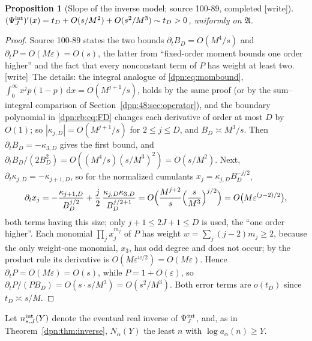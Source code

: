 \documentclass[11pt]{article}
\numberwithin{equation}{section}
\newtheorem{proposition}[theorem]{Proposition}
\theoremstyle{definition}\newtheorem{definition}[theorem]{Definition}
\theoremstyle{remark}\newtheorem{remark}[theorem]{Remark}
\newcommand{\dd}{\,\mathrm d}\newcommand{\ii}{\mathrm i}
\newcommand{\eps}{\varepsilon}
\newcommand{\wrt}{\textup{[write]}}
\begin{document}
\begin{proposition}[Slope of the inverse model; source 100-89, completed \wrt]\label{dpn:rb:prop:slope}
$(\Psi^{\rm int}_J)'(x)=t_D+O(s/M^2)+O(s^2/M^3)\sim t_D>0$, uniformly on
$\mathfrak A$.
\end{proposition}
\begin{proof}
Source 100-89 states the two bounds $\partial_tB_D=O(M^4/s)$ and
$\partial_tP=O(M\eps)=O(s)$, the latter from ``fixed-order moment bounds one
order higher'' and the fact that every nonconstant term of $P$ has weight at
least two.  \wrt\ The details: the integral analogue of
\eqref{dpn:eq:mombound}, $\int_0^\infty x^jp(1-p)\dd x=O(M^{j+1}/s)$, holds by
the same proof (or by the sum--integral comparison of
Section~\ref{dpn:48:sec:operator}), and the boundary polynomial in
\eqref{dpn:rb:eq:FD} changes each derivative of order at most $D$ by $O(1)$; so
$|\kappa_{j,D}|=O(M^{j+1}/s)$ for $2\le j\le D$, and $B_D\asymp M^3/s$.  Then
$\partial_tB_D=-\kappa_{3,D}$ gives the first bound, and
$\partial_tB_D/(2B_D^2)=O((M^4/s)(s/M^3)^2)=O(s/M^2)$.  Next,
$\partial_t\kappa_{j,D}=-\kappa_{j+1,D}$, so for the normalized cumulants
$x_j=\kappa_{j,D}B_D^{-j/2}$,
\[
 \partial_tx_j=-\frac{\kappa_{j+1,D}}{B_D^{j/2}}
 +\frac j2\,\frac{\kappa_{j,D}\kappa_{3,D}}{B_D^{j/2+1}}
 =O\Bigl(\frac{M^{j+2}}s\Bigl(\frac s{M^3}\Bigr)^{j/2}\Bigr)
 =O\bigl(M\eps^{(j-2)/2}\bigr),
\]
both terms having this size; only $j+1\le2J+1\le D$ is used, the ``one order
higher''.  Each monomial $\prod_jx_j^{m_j}$ of $P$ has weight
$w=\sum_j(j-2)m_j\ge2$, because the only weight-one monomial, $x_3$, has odd
degree and does not occur; by the product rule its derivative is
$O(M\eps^{w/2})=O(M\eps)$.  Hence $\partial_tP=O(M\eps)=O(s)$, while
$P=1+O(\eps)$, so $\partial_tP/(PB_D)=O(s\cdot s/M^3)=O(s^2/M^3)$.  Both
error terms are $o(t_D)$ since $t_D\asymp s/M$.
\end{proof}

Let $n^{\rm int}_{*,J}(Y)$ denote the eventual real inverse of
$\Psi^{\rm int}_J$, and, as in Theorem~\ref{dpn:thm:inverse}, $N_\alpha(Y)$ the
least $n$ with $\log a_\alpha(n)\ge Y$.
\end{document}
